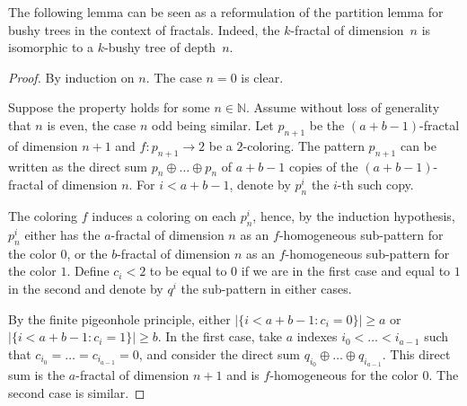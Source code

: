 \documentclass{article}
\numberwithin{theorem}{section}
\newtheorem{lemma}[theorem]{Lemma}
\newcommand{\quentin}[1]{\textcolor{green}{#1}}
\newcommand{\NN}[0]{\mathbb{N}}
\begin{document}
The following lemma can be seen as a reformulation of the partition lemma for bushy trees \cite[Lemma 2.7]{khan2017forcing} in the context of fractals. Indeed, the $k$-fractal of dimension~$n$ is isomorphic to a $k$-bushy tree of depth~$n$.


\begin{proof}
By induction on $n$. The case $n = 0$ is clear.

Suppose the property holds for some $n \in \NN$. Assume without loss of generality that $n$ is even, the case $n$ odd being similar. Let $p_{n+1}$ be the $(a + b - 1)$-fractal of dimension $n+1$ and $f : p_{n+1} \to 2$ be a $2$-coloring. The pattern $p_{n+1}$ can be written as the direct sum $p_n \oplus \dots \oplus p_n$ of $a + b - 1$ copies of the $(a + b - 1)$-fractal of dimension $n$. For $i < a + b - 1$, denote by $p_n^i$ the $i$-th such copy. %

The coloring $f$ induces a coloring on each $p_n^i$, hence, by the induction hypothesis, $p_n^i$ either has the $a$-fractal of dimension $n$ as an $f$-homogeneous sub-pattern for the color $0$, or the $b$-fractal of dimension $n$ as an $f$-homogeneous sub-pattern for the color $1$. Define $c_i < 2$ to be equal to $0$ if we are in the first case and equal to $1$ in the second and denote by $q^i$ the sub-pattern in either cases.

By the finite pigeonhole principle, either $|\{i < a + b - 1 : c_i = 0\}| \geq a$ or $|\{i < a + b - 1 : c_i = 1\}| \geq b$. In the first case, take $a$ indexes $i_0 < \dots < i_{a-1}$ such that $c_{i_0} = \dots = c_{i_{a-1}} = 0$, and consider the direct sum $q_{i_0} \oplus \dots \oplus q_{i_{a-1}}$. This direct sum is the $a$-fractal of dimension $n+1$ and is $f$-homogeneous for the color $0$. The second case is similar.
\end{proof}
\end{document}
